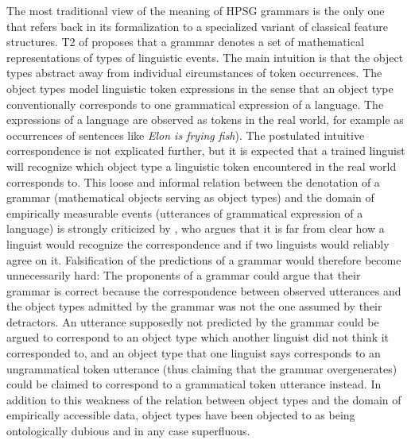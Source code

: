 \documentclass[output=paper
                ,modfonts
                ,nonflat
	        ,collection
	        ,collectionchapter
	        ,collectiontoclongg
 	        ,biblatex
                ,babelshorthands
                ,newtxmath
                ,draftmode
                ,colorlinks, citecolor=brown
]{./langsci/langscibook}
\begin{document}
{The most traditional view of the meaning of HPSG grammars is the only
one that refers back in its formalization to a specialized variant of
classical feature structures. T2 of \citet{PollardSag1994} proposes
that a grammar denotes a set of mathematical representations of types
of linguistic events. The main intuition is that the object types
abstract away from individual circumstances of token occurrences. The
object types model linguistic token expressions in the sense that an
object type conventionally corresponds to one grammatical expression
of a language. The expressions of a language are observed as tokens in
the real world, for example as occurrences of sentences like
\emph{Elon is frying fish}).  The postulated intuitive correspondence is not
explicated further, but it is expected that a trained linguist will
recognize which object type a linguistic token encountered in the real
world corresponds to.  This loose and informal relation between the
denotation of a grammar (mathematical objects serving as object types)
and the domain of empirically measurable events (utterances of
grammatical expression of a language) is strongly criticized by
\citet{King99a-u}, who argues that it is far from clear how a linguist
would recognize the correspondence and if two linguists would reliably
agree on it. Falsification of the predictions
of a grammar would therefore become unnecessarily hard: The proponents
of a grammar could argue that their grammar is correct because the
correspondence between observed utterances and the object types
admitted by the grammar was not the one assumed by their
detractors. An utterance supposedly not predicted by the grammar could
be argued to correspond to an object type which another linguist did not
think it corresponded to, and an object type
that one linguist says corresponds to an ungrammatical token utterance
(thus claiming that the grammar overgenerates) could be claimed
to correspond  to a grammatical token utterance instead. In addition to this
weakness of the relation between object types and the domain of empirically
accessible data, object types have been objected to as being ontologically
dubious and in any case superfluous.

}
\end{document}
